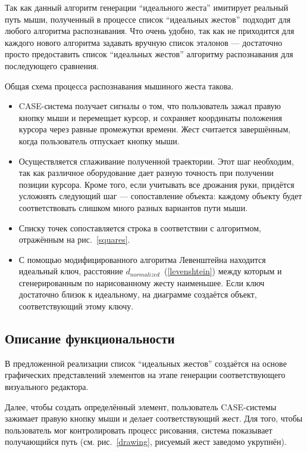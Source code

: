 \documentclass[a5paper]{article}
\begin{document}
Так как данный алгоритм генерации ``идеального жеста'' имитирует реальный путь мыши, полученный в процессе список ``идеальных жестов'' подходит для любого алгоритма распознавания. Что очень удобно, так как не приходится для каждого нового алгоритма задавать вручную список эталонов --- достаточно просто предоставить список ``идеальных жестов'' алгоритму распознавания для последующего сравнения.

Общая схема процесса распознавания мышиного жеста такова.

\begin{itemize}
  \item CASE-система получает сигналы о том, что пользователь зажал правую кнопку мыши и перемещает курсор, и сохраняет координаты положения курсора через равные промежутки времени. Жест считается завершённым, когда пользователь отпускает кнопку мыши.
  \item Осуществляется сглаживание полученной траектории. Этот шаг необходим, так как различное оборудование дает разную точность при получении позиции курсора. Кроме того, если учитывать все дрожания руки, придётся усложнять следующий шаг --- сопоставление объекта: каждому объекту будет соответствовать слишком много разных вариантов пути мыши.
  \item Списку точек сопоставляется строка в соответствии с алгоритмом, отражённым на рис.~\ref{squares}.
  \item С помощью модифицированного алгоритма Левенштейна находится идеальный ключ, расстояние $d_{normalized}$~(\ref{levenshtein}) между которым и сгенерированным по нарисованному жесту наименьшее. Если ключ достаточно близок к идеальному, на диаграмме создаётся объект, соответствующий этому ключу.
\end{itemize}

\subsection{Описание функциональности}
В предложенной реализации список ``идеальных жестов'' создаётся на основе графических представлений элементов на этапе генерации соответствующего визуального редактора.

Далее, чтобы создать определённый элемент, пользователь CASE-системы зажимает правую кнопку мыши и делает соответствующий жест. Для того, чтобы пользователь мог контролировать процесс рисования, система показывает получающийся путь (см. рис.~\ref{drawing}, рисуемый жест заведомо укрупнён).
\end{document}
